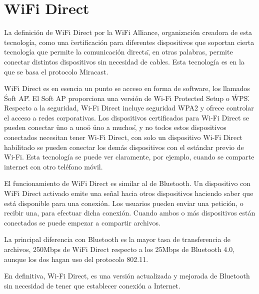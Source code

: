 \section{WiFi Direct}

La definición de WiFi Direct por la WiFi Alliance, organización creadora de esta tecnología, como una \"certificación para diferentes dispositivos que soportan cierta tecnología que permite la comunicación directa\", en otras palabras, permite conectar distintos dispositivos sin necesidad de cables. Esta tecnología es en la que se basa el protocolo Miracast.

WiFi Direct es en esencia un punto se acceso en forma de software, los llamados \'Soft AP\'. El Soft AP proporciona una versión de Wi-Fi Protected Setup o \'WPS\'. Respecto a la seguridad, Wi-Fi Direct incluye seguridad WPA2 y ofrece controlar el acceso a redes corporativas. Los dispositivos certificados para Wi-Fi Direct se pueden conectar \"uno a uno\" o \"uno a muchos\", y no todos estos dispositivos conectados necesitan tener Wi-Fi Direct, con solo un dispositivo Wi-Fi Direct habilitado se pueden conectar los demás dispositivos con el estándar previo de Wi-Fi. Esta tecnología se puede ver claramente, por ejemplo, cuando se comparte internet con otro teléfono móvil.

El funcionamiento de WiFi Direct es similar al de Bluetooth. Un dispositivo con  WiFi Direct activado emite una señal hacia otros dispositivos haciendo saber que está disponible para una conexión. Los usuarios pueden enviar una petición, o recibir una, para efectuar dicha conexión. Cuando ambos o más dispositivos están conectados se puede empezar a compartir archivos.

La principal diferencia con Bluetooth es la mayor tasa de transferencia de archivos, 250Mbps de WiFi Direct respecto a los 25Mbps de Bluetooth 4.0, aunque los dos hagan uso del protocolo 802.11.

En definitiva, Wi-Fi Direct, es una versión actualizada y mejorada de Bluetooth sin necesidad de tener que establecer conexión a Internet.
